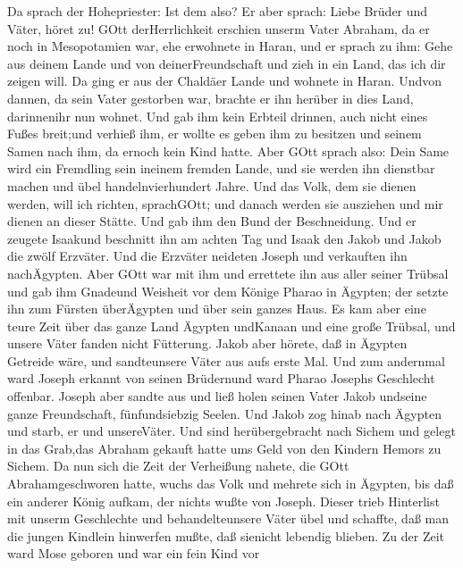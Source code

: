  Da sprach der Hohepriester: Ist dem also?  Er
aber sprach: Liebe Brüder und Väter, höret zu! GOtt derHerrlichkeit
erschien unserm Vater Abraham, da er noch in Mesopotamien war, ehe
erwohnete in Haran,  und er sprach zu ihm: Gehe aus deinem
Lande und von deinerFreundschaft und zieh in ein Land, das ich dir
zeigen will.  Da ging er aus der Chaldäer Lande und wohnete
in Haran. Undvon dannen, da sein Vater gestorben war, brachte er ihn
herüber in dies Land, darinnenihr nun wohnet.  Und gab ihm
kein Erbteil drinnen, auch nicht eines Fußes breit;und verhieß ihm, er
wollte es geben ihm zu besitzen und seinem Samen nach ihm, da ernoch
kein Kind hatte.  Aber GOtt sprach also: Dein Same wird ein
Fremdling sein ineinem fremden Lande, und sie werden ihn dienstbar
machen und übel handelnvierhundert Jahre.  Und das Volk, dem
sie dienen werden, will ich richten, sprachGOtt; und danach werden sie
ausziehen und mir dienen an dieser Stätte.  Und gab ihm den
Bund der Beschneidung. Und er zeugete Isaakund beschnitt ihn am achten
Tag und Isaak den Jakob und Jakob die zwölf Erzväter.  Und
die Erzväter neideten Joseph und verkauften ihn nachÄgypten. Aber GOtt
war mit ihm  und errettete ihn aus aller seiner Trübsal und
gab ihm Gnadeund Weisheit vor dem Könige Pharao in Ägypten; der setzte
ihn zum Fürsten überÄgypten und über sein ganzes Haus.  Es
kam aber eine teure Zeit über das ganze Land Ägypten undKanaan und eine
große Trübsal, und unsere Väter fanden nicht Fütterung. 
Jakob aber hörete, daß in Ägypten Getreide wäre, und sandteunsere Väter
aus aufs erste Mal.  Und zum andernmal ward Joseph erkannt
von seinen Brüdernund ward Pharao Josephs Geschlecht offenbar.
 Joseph aber sandte aus und ließ holen seinen Vater Jakob
undseine ganze Freundschaft, fünfundsiebzig Seelen.  Und
Jakob zog hinab nach Ägypten und starb, er und unsereVäter.
 Und sind herübergebracht nach Sichem und gelegt in das
Grab,das Abraham gekauft hatte ums Geld von den Kindern Hemors zu
Sichem.  Da nun sich die Zeit der Verheißung nahete, die
GOtt Abrahamgeschworen hatte, wuchs das Volk und mehrete sich in
Ägypten,  bis daß ein anderer König aufkam, der nichts
wußte von Joseph.  Dieser trieb Hinterlist mit unserm
Geschlechte und behandelteunsere Väter übel und schaffte, daß man die
jungen Kindlein hinwerfen mußte, daß sienicht lebendig blieben.
 Zu der Zeit ward Mose geboren und war ein fein Kind vor
